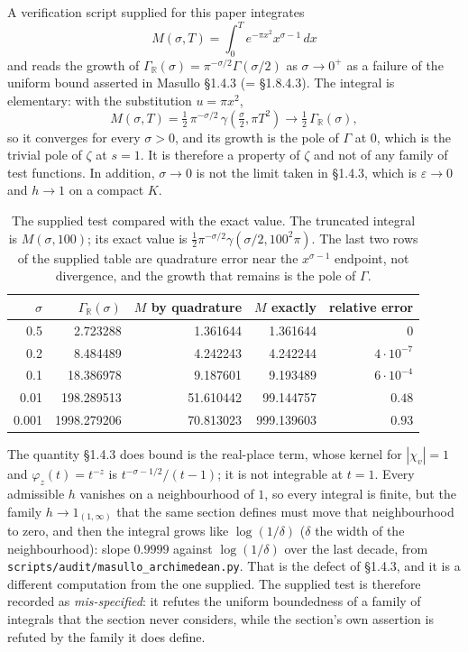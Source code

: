 \documentclass[11pt,a4paper]{article}
\begin{document}
A verification script supplied for this paper integrates
\[
  M(\sigma,T)=\int_0^T e^{-\pi x^2}x^{\sigma-1}\,dx
\]
and reads the growth of $\Gamma_{\mathbb{R}}(\sigma)=\pi^{-\sigma/2}\Gamma(\sigma/2)$ as
$\sigma\to0^{+}$ as a failure of the uniform bound asserted in Masullo \S1.4.3 (= \S1.8.4.3).
The integral is elementary: with the substitution $u=\pi x^2$,
\[
  M(\sigma,T)=\tfrac12\,\pi^{-\sigma/2}\,\gamma\!\left(\tfrac{\sigma}{2},\pi T^2\right)
  \longrightarrow \tfrac12\,\Gamma_{\mathbb{R}}(\sigma),
\]
so it converges for every $\sigma>0$, and its growth is the pole of $\Gamma$ at $0$, which is the
trivial pole of $\zeta$ at $s=1$. It is therefore a property of $\zeta$ and not of any family of
test functions. In addition, $\sigma\to0$ is not the limit taken in \S1.4.3, which is
$\varepsilon\to0$ and $h\to1$ on a compact $K$.

\begin{table}[htbp]
\centering
\caption{The supplied test compared with the exact value. The truncated integral is
$M(\sigma,100)$; its exact value is $\tfrac12\pi^{-\sigma/2}\gamma(\sigma/2,100^2\pi)$. The
last two rows of the supplied table are quadrature error near the $x^{\sigma-1}$ endpoint, not
divergence, and the growth that remains is the pole of $\Gamma$.}
\label{tab:gamma}
\footnotesize
\begin{tabular}{@{}rrrrr@{}}
\toprule
$\sigma$ & $\Gamma_{\mathbb{R}}(\sigma)$ & $M$ by quadrature & $M$ exactly & relative error \\
\midrule
0.5 & 2.723288 & 1.361644 & 1.361644 & $0$ \\
0.2 & 8.484489 & 4.242243 & 4.242244 & $4\cdot10^{-7}$ \\
0.1 & 18.386978 & 9.187601 & 9.193489 & $6\cdot10^{-4}$ \\
0.01 & 198.289513 & 51.610442 & 99.144757 & $0.48$ \\
0.001 & 1998.279206 & 70.813023 & 999.139603 & $0.93$ \\
\bottomrule
\end{tabular}
\end{table}

The quantity \S1.4.3 does bound is the real-place term, whose kernel for $|\chi_v|=1$ and
$\varphi_z(t)=t^{-z}$ is $t^{-\sigma-1/2}/(t-1)$; it is not integrable at $t=1$. Every
admissible $h$ vanishes on a neighbourhood of $1$, so every integral is finite, but the family
$h\to1_{(1,\infty)}$ that the same section defines must move that neighbourhood to zero, and
then the integral grows like $\log(1/\delta)$ ($\delta$ the width of the neighbourhood): slope
$0.9999$ against $\log(1/\delta)$ over the last decade, from
\texttt{scripts/audit/masullo\_archimedean.py}. That is the defect of \S1.4.3, and it is a
different computation from the one supplied. The supplied test is therefore recorded as
\emph{mis-specified}: it refutes the uniform boundedness of a family of integrals that the
section never considers, while the section's own assertion is refuted by the family it does
define.
\end{document}
